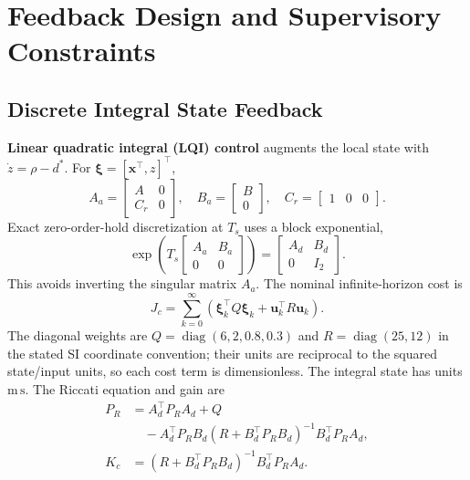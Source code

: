 \section{Feedback Design and Supervisory Constraints}
\label{sec:control}
\subsection{Discrete Integral State Feedback}
\textbf{Linear quadratic integral (LQI) control} augments the local state with $\dot z=\rho-d^\ast$. For $\boldsymbol\xi=[\mathbf x^\top,z]^\top$,
\begin{equation}
A_a=\begin{bmatrix}A&0\\C_r&0\end{bmatrix},\quad
B_a=\begin{bmatrix}B\\0\end{bmatrix},\quad C_r=\begin{bmatrix}1&0&0\end{bmatrix}.
\end{equation}
Exact zero-order-hold discretization at $T_s$ uses a block exponential,
\begin{equation}
\exp\!\left(T_s\begin{bmatrix}A_a&B_a\\0&0\end{bmatrix}\right)
=\begin{bmatrix}A_d&B_d\\0&I_2\end{bmatrix}.
\end{equation}
This avoids inverting the singular matrix $A_a$. The nominal infinite-horizon cost is
\begin{equation}
J_c=\sum_{k=0}^{\infty}\left(\boldsymbol\xi_k^\top Q\boldsymbol\xi_k+\mathbf u_k^\top R\mathbf u_k\right).
\end{equation}
The diagonal weights are $Q=\operatorname{diag}(6,2,0.8,0.3)$ and $R=\operatorname{diag}(25,12)$ in the stated SI coordinate convention; their units are reciprocal to the squared state/input units, so each cost term is dimensionless. The integral state has units $\mathrm{m\,s}$. The Riccati equation and gain are
\begin{equation}
\begin{aligned}
P_R&=A_d^\top P_RA_d+Q\\
&\quad-A_d^\top P_RB_d(R+B_d^\top P_RB_d)^{-1}B_d^\top P_RA_d,\\
K_c&=(R+B_d^\top P_RB_d)^{-1}B_d^\top P_RA_d.
\end{aligned}
\end{equation}
